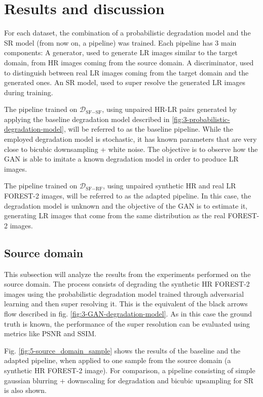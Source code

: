 
\section{Results and discussion}
\label{sec:results}


For each dataset, the combination of a probabilistic degradation model and the SR model (from now on, a pipeline) was trained. 
Each pipeline has 3 main components: A generator, used to generate LR images similar to the target domain, from HR images coming from the source domain. A discriminator, used to distinguish between real LR images coming from the target domain and the generated ones. An SR model, used to super resolve the generated LR images during training.


The pipeline trained on $\mathcal{D}_{\text{SF}-\text{SF}}$, using unpaired HR-LR pairs generated by applying the baseline degradation model described in \ref{fig:3-probabilistic-degradation-model}, will be referred to as the baseline pipeline.
While the employed degradation model is stochastic, it has known parameters that are very close to bicubic downsampling + white noise. The objective is to observe how the GAN is able to imitate a known degradation model  in order to produce LR images.

The pipeline trained on $\mathcal{D}_{\text{SF}-\text{RF}}$, using unpaired synthetic HR and real LR FOREST-2 images, will be referred to as the adapted pipeline.
In this case, the degradation model is unknown and the objective of the GAN is to estimate it, generating LR images that come from the same distribution as the real FOREST-2 images.

    \subsection{Source domain}

        This subsection will analyze the results from the experiments performed on the source domain.
        The process consists of degrading the synthetic HR FOREST-2 images using the probabilistic degradation model trained through adversarial learning and then super resolving it.
        This is the equivalent of the black arrows flow described in fig. \ref{fig:3-GAN-degradation-model}. 
        As in this case the ground truth is known, the performance of the super resolution can be evaluated using metrics like PSNR and SSIM. 

        Fig. \ref{fig:5-source_domain_sample} shows the results of the baseline and the adapted pipeline, when applied to one sample from the source domain (a synthetic HR FOREST-2 image). 
        For comparison, a pipeline consisting of simple gaussian blurring + downscaling for degradation and bicubic upsampling for SR is also shown. 

